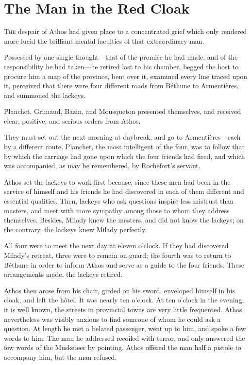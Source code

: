
\chapter{The Man in the Red Cloak}

\lettrine{T}{he} despair of Athos had given place to a concentrated grief which only rendered more lucid the brilliant mental faculties of that extraordinary man. 

\zz
Possessed by one single thought—that of the promise he had made, and of the responsibility he had taken—he retired last to his chamber, begged the host to procure him a map of the province, bent over it, examined every line traced upon it, perceived that there were four different roads from Béthune to Armentières, and summoned the lackeys. 

Planchet, Grimaud, Bazin, and Mousqueton presented themselves, and received clear, positive, and serious orders from Athos. 

They must set out the next morning at daybreak, and go to Armentières—each by a different route. Planchet, the most intelligent of the four, was to follow that by which the carriage had gone upon which the four friends had fired, and which was accompanied, as may be remembered, by Rochefort's servant. 

Athos set the lackeys to work first because, since these men had been in the service of himself and his friends he had discovered in each of them different and essential qualities. Then, lackeys who ask questions inspire less mistrust than masters, and meet with more sympathy among those to whom they address themselves. Besides, Milady knew the masters, and did not know the lackeys; on the contrary, the lackeys knew Milady perfectly. 

All four were to meet the next day at eleven o'clock. If they had discovered Milady's retreat, three were to remain on guard; the fourth was to return to Béthune in order to inform Athos and serve as a guide to the four friends. These arrangements made, the lackeys retired. 

Athos then arose from his chair, girded on his sword, enveloped himself in his cloak, and left the hôtel. It was nearly ten o'clock. At ten o'clock in the evening, it is well known, the streets in provincial towns are very little frequented. Athos nevertheless was visibly anxious to find someone of whom he could ask a question. At length he met a belated passenger, went up to him, and spoke a few words to him. The man he addressed recoiled with terror, and only answered the few words of the Musketeer by pointing. Athos offered the man half a pistole to accompany him, but the man refused. 

